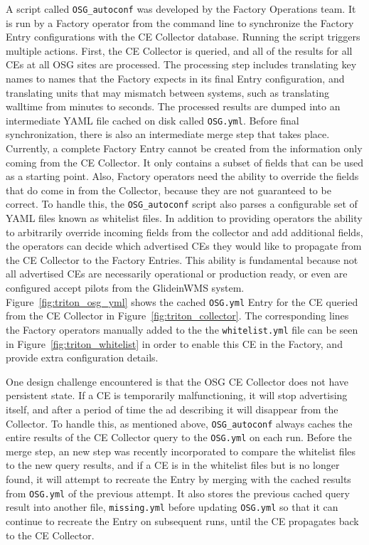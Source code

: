 \documentclass[manuscript,screen,review]{acmart}
\begin{document}
A script called \verb"OSG_autoconf" was developed by the Factory Operations team. It is run by a Factory operator from the command line to synchronize the Factory Entry configurations with the CE Collector database. Running the script triggers multiple actions. First, the CE Collector is queried, and all of the results for all CEs at all OSG sites are processed. The processing step includes translating key names to names that the Factory expects in its final Entry configuration, and translating units that may mismatch between systems, such as translating walltime from minutes to seconds. The processed results are dumped into an intermediate YAML file cached on disk called \verb"OSG.yml". Before final synchronization, there is also an intermediate merge step that takes place. Currently, a complete Factory Entry cannot be created from the information only coming from the CE Collector. It only contains a subset of fields that can be used as a starting point. Also, Factory operators need the ability to override the fields that do come in from the Collector, because they are not guaranteed to be correct. To handle this, the \verb"OSG_autoconf" script also parses a configurable set of YAML files known as whitelist files. In addition to providing operators the ability to arbitrarily override incoming fields from the collector and add additional fields, the operators can decide which advertised CEs they would like to propagate from the CE Collector to the Factory Entries. This ability is fundamental because not all advertised CEs are necessarily operational or production ready, or even are configured accept pilots from the GlideinWMS system. Figure~\ref{fig:triton_osg_yml} shows the cached \verb"OSG.yml" Entry for the CE queried from the CE Collector in Figure~\ref{fig:triton_collector}. The corresponding lines the Factory operators manually added to the the \verb"whitelist.yml" file can be seen in Figure~\ref{fig:triton_whitelist} in order to enable this CE in the Factory, and provide extra configuration details.

One design challenge encountered is that the OSG CE Collector does not have persistent state. If a CE is temporarily malfunctioning, it will stop advertising itself, and after a period of time the ad describing it will disappear from the Collector. To handle this, as mentioned above, \verb"OSG_autoconf" always caches the entire results of the CE Collector query to the \verb"OSG.yml" on each run. Before the merge step, an new step was recently incorporated to compare the whitelist files to the new query results, and if a CE is in the whitelist files but is no longer found, it will attempt to recreate the Entry by merging with the cached results from \verb"OSG.yml" of the previous attempt. It also stores the previous cached query result into another file, \verb"missing.yml" before updating \verb"OSG.yml" so that it can continue to recreate the Entry on subsequent runs, until the CE propagates back to the CE Collector. 
\end{document}
